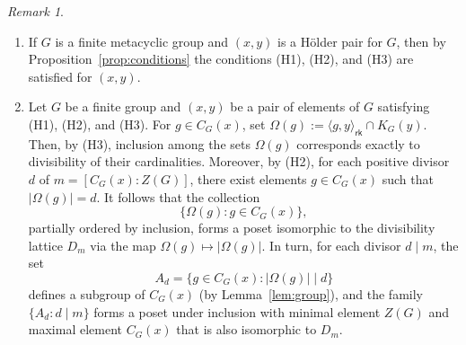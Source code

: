 \documentclass[a4paper,12pt]{article}
\theoremstyle{definition}
\theoremstyle{remark}
\newtheorem*{rem}{Remark}
\begin{document}
\begin{rem}\mbox{}
  \begin{enumerate}
  \item If $G$ is a finite metacyclic group and $(x,y)$ is a Hölder pair for $G$, then by Proposition~\ref{prop:conditions} the conditions (H1), (H2), and (H3) are satisfied for $(x,y)$.
  \item Let $G$ be a finite group and $(x,y)$ be a pair of elements of $G$ satisfying (H1), (H2), and (H3). For $g\in C_G(x)$, set $\Omega(g):=\langle g,y\rangle_{\mathsf{rk}}\cap K_G(y)$. Then, by (H3), inclusion among the sets $\Omega(g)$ corresponds exactly to divisibility of their cardinalities. Moreover, by (H2), for each positive divisor $d$ of $m=[C_G(x):Z(G)]$, there exist elements $g\in C_G(x)$ such that $|\Omega(g)|=d$. It follows that the collection
    $$ \{\Omega(g)\colon g\in C_G(x)\}, $$
    partially ordered by inclusion, forms a poset isomorphic to the divisibility lattice $D_m$ via the map $ \Omega(g)\longmapsto |\Omega(g)|$. In turn, for each divisor $d\mid m$, the set
    $$ A_d=\{g\in C_G(x)\colon |\Omega(g)|\mid d\} $$
    defines a subgroup of $C_G(x)$ (by Lemma~\ref{lem:group}), and the family $\{A_d\colon d\mid m\}$ forms a poset under inclusion with minimal element $Z(G)$ and maximal element $C_G(x)$ that is also isomorphic to $D_m$.
  \end{enumerate}
\end{rem}
\end{document}
